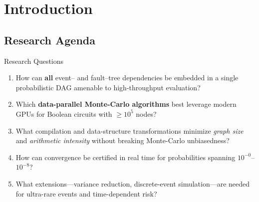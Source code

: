 \section{Introduction}
\subsection{Research Agenda}
\begin{frame}{Research Questions}
  \begin{enumerate}[<+->]
    \item How can \textbf{all} event– and fault–tree dependencies be embedded in a single probabilistic DAG amenable to high-throughput evaluation?
    \item Which \textbf{data-parallel Monte-Carlo algorithms} best leverage modern GPUs for Boolean circuits with $\ge 10^{5}$ nodes?
    \item What compilation and data-structure transformations minimize \emph{graph size} and \emph{arithmetic intensity} without breaking Monte-Carlo unbiasedness?
    \item How can convergence be certified in real time for probabilities spanning $10^{-0}$–$10^{-8}$?
    \item What extensions—variance reduction, discrete-event simulation—are needed for ultra-rare events and time-dependent risk?
  \end{enumerate}
\end{frame}
